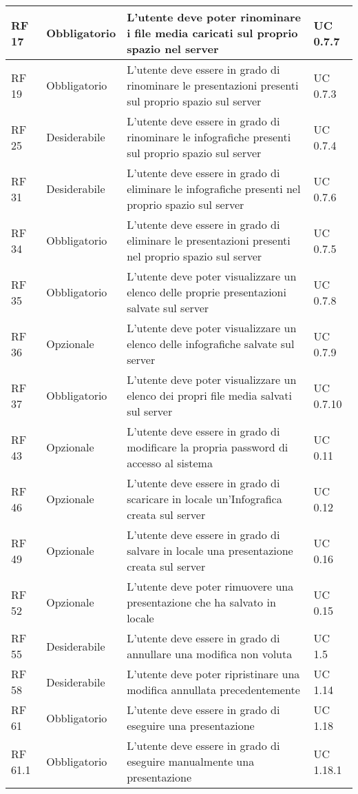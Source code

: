 {\begin{longtable} [c]{| p{2.5cm} | p{2.5cm} | p{6cm} |p{2.5cm}|}
RF 17 & Obbligatorio & L'utente deve poter rinominare i file media caricati sul proprio spazio nel server & UC 0.7.7\\ 
 \hline 
RF 19 & Obbligatorio & L'utente deve essere in grado di rinominare le presentazioni presenti sul proprio spazio sul server & UC 0.7.3\\ 
 \hline 
RF 25 & Desiderabile & L'utente deve essere in grado di rinominare le infografiche presenti sul proprio spazio sul server & UC 0.7.4\\ 
 \hline 
RF 31 & Desiderabile & L'utente deve essere in grado di eliminare le infografiche presenti nel proprio spazio sul server & UC 0.7.6\\ 
 \hline 
RF 34 & Obbligatorio & L’utente deve essere in grado di eliminare le presentazioni presenti nel proprio spazio sul server & UC 0.7.5\\ 
 \hline 
RF 35 & Obbligatorio & L'utente deve poter visualizzare un elenco delle proprie presentazioni salvate sul server & UC 0.7.8\\ 
 \hline 
RF 36 & Opzionale & L'utente deve poter visualizzare un elenco delle infografiche salvate sul server & UC 0.7.9\\ 
 \hline 
RF 37 & Obbligatorio & L'utente deve poter visualizzare un elenco dei propri file media salvati sul server & UC 0.7.10\\ 
 \hline 
RF 43 & Opzionale & L’utente deve essere in grado di modificare la propria password di accesso al sistema & UC 0.11\\ 
 \hline 
RF 46 & Opzionale & L’utente deve essere in grado di scaricare in locale un’Infografica creata sul server & UC 0.12\\ 
 \hline 
RF 49 & Opzionale & L’utente deve essere in grado di salvare in locale una presentazione creata sul server & UC 0.16\\ 
 \hline 
RF 52 & Opzionale & L’utente deve poter rimuovere una presentazione che ha salvato in locale & UC 0.15\\ 
 \hline 
RF 55 & Desiderabile & L'utente deve essere in grado di annullare una modifica non voluta & UC 1.5\\ 
 \hline 
RF 58 & Desiderabile & L'utente deve poter ripristinare una modifica annullata precedentemente & UC 1.14\\ 
 \hline 
RF 61 & Obbligatorio & L'utente deve essere in grado di eseguire una presentazione & UC 1.18\\ 
 \hline 
RF 61.1 & Obbligatorio & L'utente deve essere in grado di eseguire manualmente una presentazione & UC 1.18.1\\ 

\end{longtable}}

